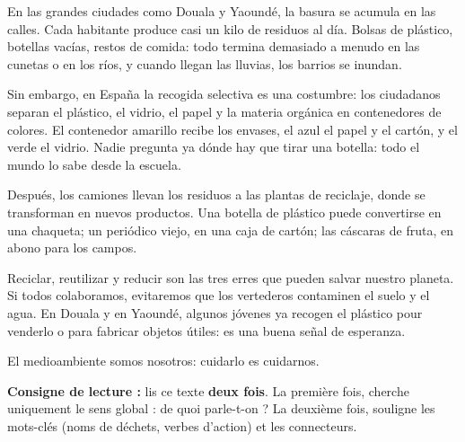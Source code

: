 \documentclass[11pt]{article}
\newcounter{popsec}
\newcounter{popsub}
\newcommand{\courssub}[1]{%
  \stepcounter{popsub}%
  \par\vspace{9pt}\noindent{\popxbold\fontsize{11.5}{13}\selectfont\color{popink}{\color{poporange}\thepopsec.\thepopsub}\hspace{6pt}#1}\par\nopagebreak\vspace{4pt}
}
\begin{document}
\courssub{Lecture du texte intégral}

\begin{textebox}
En las grandes ciudades como Douala y Yaoundé, la basura se acumula en las calles. Cada habitante produce casi un kilo de residuos al día. Bolsas de plástico, botellas vacías, restos de comida: todo termina demasiado a menudo en las cunetas o en los ríos, y cuando llegan las lluvias, los barrios se inundan.

Sin embargo, en España la recogida selectiva es una costumbre: los ciudadanos separan el plástico, el vidrio, el papel y la materia orgánica en contenedores de colores. El contenedor amarillo recibe los envases, el azul el papel y el cartón, y el verde el vidrio. Nadie pregunta ya dónde hay que tirar una botella: todo el mundo lo sabe desde la escuela.

Después, los camiones llevan los residuos a las plantas de reciclaje, donde se transforman en nuevos productos. Una botella de plástico puede convertirse en una chaqueta; un periódico viejo, en una caja de cartón; las cáscaras de fruta, en abono para los campos.

Reciclar, reutilizar y reducir son las tres erres que pueden salvar nuestro planeta. Si todos colaboramos, evitaremos que los vertederos contaminen el suelo y el agua. En Douala y en Yaoundé, algunos jóvenes ya recogen el plástico pour venderlo o para fabricar objetos útiles: es una buena señal de esperanza.

El medioambiente somos nosotros: cuidarlo es cuidarnos.
\end{textebox}

\textbf{Consigne de lecture :} lis ce texte \textbf{deux fois}. La première fois, cherche uniquement le sens global : de quoi parle-t-on ? La deuxième fois, souligne les mots-clés (noms de déchets, verbes d'action) et les connecteurs.
\end{document}
